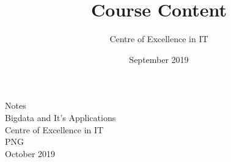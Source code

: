 \documentclass[a4paper]{article}
\title{Course Content}
\author{Centre of Excellence in IT}
\date{September 2019}
\begin{document}
\begin{center}
Notes \\
{\Huge
\vspace{4cm}
Bigdata and It's Applications \\
\vspace{7cm}
Centre of Excellence in IT\\ PNG \\ 
\vspace{7cm}
}
October 2019
\end{center}

\newpage



\end{document}
